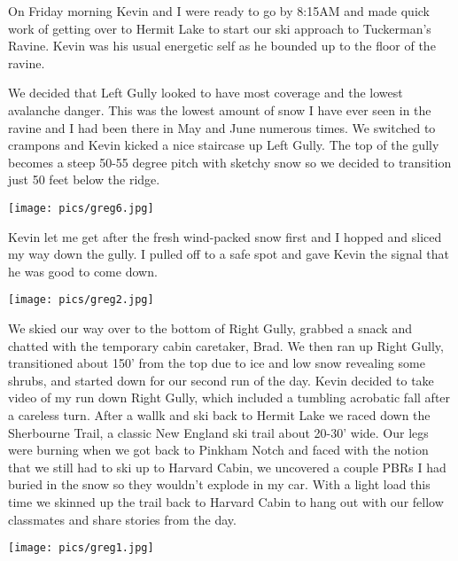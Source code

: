 \documentclass[10pt,a4paper]{article}
\newenvironment{Figure}
  {\par\medskip\noindent\minipage{\linewidth}}
  {\endminipage\par\medskip}
\begin{document}
\begin{multicols}{2}
On Friday morning Kevin and I were ready to go by 8:15AM and made quick work of getting over to Hermit Lake to start our ski approach to Tuckerman's Ravine.   Kevin was his usual energetic self as he bounded up to the floor of the ravine.  


We decided that Left Gully looked to have most coverage and the lowest avalanche danger.  This was the lowest amount of snow I have ever seen in the ravine and I had been there in May and June numerous times.  We switched to crampons and Kevin kicked a nice staircase up Left Gully.  The top of the gully becomes a steep 50-55 degree pitch with sketchy snow so we decided to transition just 50 feet below the ridge. 

\begin{Figure}
 \centering
 \texttt{[image: pics/greg6.jpg]}
\end{Figure}

 Kevin let me get after the fresh wind-packed snow first and I hopped and sliced my way down the gully.  I pulled off to a safe spot and gave Kevin the signal that he was good to come down. 

\begin{Figure}
 \centering
 \texttt{[image: pics/greg2.jpg]}
\end{Figure}


 We skied our way over to the bottom of Right Gully, grabbed a snack and chatted with the temporary cabin caretaker, Brad.  We then ran up Right Gully, transitioned about 150' from the top due to ice and low snow revealing some shrubs, and started down for our second run of the day.   Kevin decided to take video of my run down Right Gully, which included a tumbling acrobatic fall after a careless turn.  After a wallk and ski back to Hermit Lake we raced down the Sherbourne Trail, a classic New England ski trail about 20-30' wide.  Our legs were burning when we got back to Pinkham Notch and faced with the notion that we still had to ski up to Harvard Cabin, we uncovered a couple PBRs I had buried in the snow so they wouldn't explode in my car.  With a light load this time we skinned up the trail back to Harvard Cabin to hang out with our fellow classmates and share stories from the day.  
 
\begin{Figure}
 \centering
 \texttt{[image: pics/greg1.jpg]}
\end{Figure}


\end{multicols}
\end{document}
